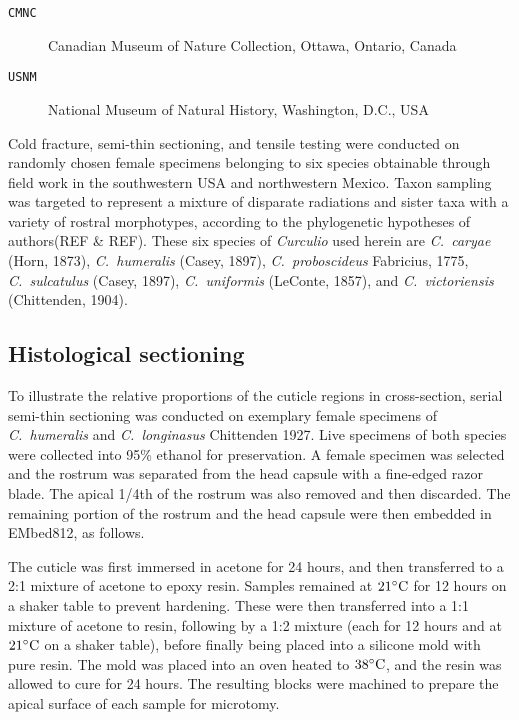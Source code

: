\documentclass[twocolumn, linenumbers, superscriptaddress, nofootinbib]{revtex4-1}
\begin{document}
			\begin{description}
				\item [\texttt{CMNC}]  Canadian Museum of Nature Collection, Ottawa, Ontario, Canada
				\item [\texttt{USNM}]  National Museum of Natural History, Washington, D.C., USA
			\end{description}
		
			Cold fracture, semi-thin sectioning, and tensile testing were conducted on randomly chosen female specimens belonging to six species obtainable through field work in the southwestern USA and northwestern Mexico.
			Taxon sampling was targeted to represent a mixture of disparate radiations and sister taxa with a variety of rostral morphotypes, according to the phylogenetic hypotheses of authors(REF \& REF).
			These six species of \textit{Curculio} used herein are \textit{C.~caryae} (Horn, 1873), \textit{C.~humeralis} (Casey, 1897), \textit{C.~proboscideus} Fabricius, 1775, \textit{C.~sulcatulus} (Casey, 1897), \textit{C.~uniformis} (LeConte, 1857), and \textit{C.~victoriensis} (Chittenden, 1904).
	
		\subsection*{Histological sectioning}
			To illustrate the relative proportions of the cuticle regions in cross-section, serial semi-thin sectioning was conducted on exemplary female specimens of \textit{C.~humeralis} and \textit{C.~longinasus} Chittenden 1927.
			Live specimens of both species were collected into 95\% ethanol for
			preservation.
			A female specimen was selected and the rostrum was separated from the head capsule with a fine-edged razor blade.
			The apical 1/4th of	the rostrum was also removed and then discarded.
			The remaining portion	of the rostrum and the head capsule were then embedded in EMbed812, as follows.
			
			The cuticle was first immersed in acetone for 24 hours, and then transferred to a 2:1 mixture of acetone to epoxy resin.
			Samples remained at $21\degree\text{C}$ for 12 hours on a shaker table to prevent hardening.
			These were then transferred into a 1:1 mixture of acetone to resin, following by a 1:2 mixture (each for 12 hours and at $21\degree\text{C}$ on a shaker table), before finally being placed into a silicone mold with pure resin.
			The mold was placed	into an oven heated to $38\degree\text{C}$, and the resin was allowed to cure for 24 hours.
			The resulting blocks were machined to prepare the apical surface of each
			sample for microtomy.
			
\end{document}
